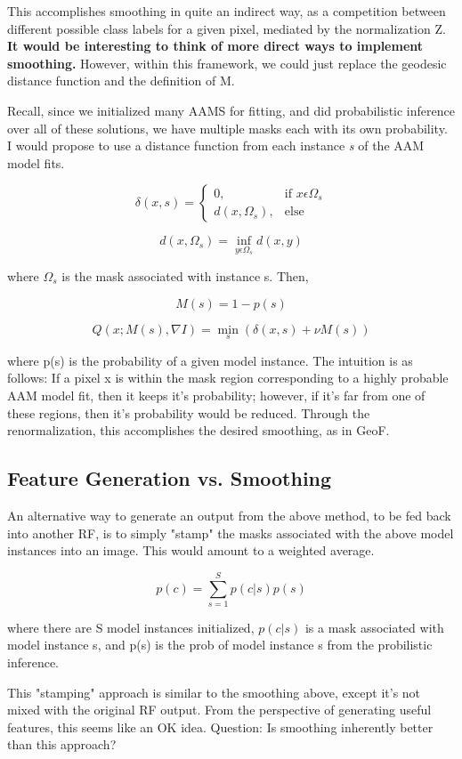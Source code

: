 \documentclass[10pt,twocolumn,letterpaper]{article}
\begin{document}
This accomplishes smoothing in quite an indirect way, as a competition between different possible class labels for a given pixel, mediated by the normalization Z.  \textbf{It would be interesting to think of more direct ways to implement smoothing.}  However, within this framework, we could just replace the geodesic distance function and the definition of M.

Recall, since we initialized many AAMS for fitting, and did probabilistic inference over all of these solutions, we have multiple masks each with its own probability.  I would propose to use a distance function from each instance \emph{s} of the AAM model fits.

\[ \delta (x,s) = \begin{cases} 0, & \mbox{if } x \epsilon \Omega _s \\ d(x, \Omega _s), & \mbox{else} \end{cases} \]

\[ d(x,\Omega _s) = \inf_{y \epsilon \Omega _s} d(x,y) \]

where $\Omega _s$ is the mask associated with instance s.  Then, 

\[ M(s) = 1 - p(s) \] 

\[ Q(x; M(s), \nabla I) = \min_{s} (\delta (x,s) + \nu M(s)) \]

where p(s) is the probability of a given model instance.  The intuition is as follows: If a pixel x is within the mask region corresponding to a highly probable AAM model fit, then it keeps it's probability; however, if it's far from one of these regions, then it's probability would be reduced.  Through the renormalization, this accomplishes the desired smoothing, as in GeoF.

\subsection{Feature Generation vs. Smoothing}

An alternative way to generate an output from the above method, to be fed back into another RF, is to simply "stamp" the masks associated with the above model instances into an image.  This would amount to a weighted average.

\[ p(c) = \sum_{s=1}^S p(c|s)p(s) \]

where there are S model instances initialized, $p(c|s)$ is a mask associated with model instance s, and p(s) is the prob of model instance s from the probilistic inference.

This "stamping" approach is similar to the smoothing above, except it's not mixed with the original RF output.  From the perspective of generating useful features, this seems like an OK idea.  Question: Is smoothing inherently better than this approach?
\end{document}
